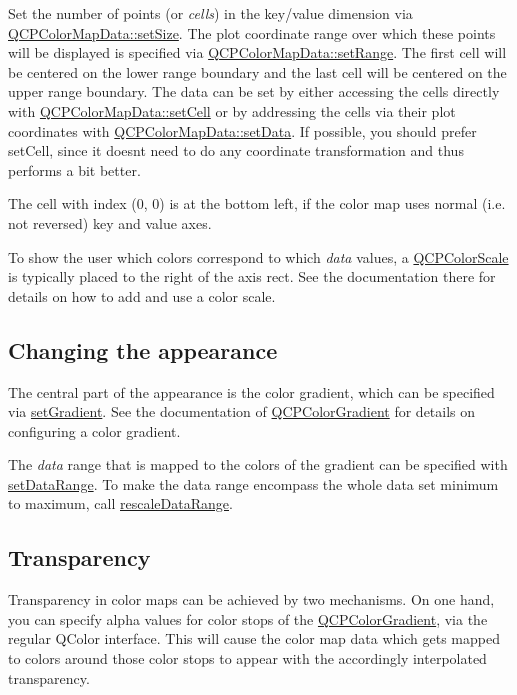 Set the number of points (or {\itshape cells}) in the key/value dimension via \hyperlink{class_q_c_p_color_map_data_a0d9ff35c299d0478b682bfbcdd9c097e}{Q\+C\+P\+Color\+Map\+Data\+::set\+Size}. The plot coordinate range over which these points will be displayed is specified via \hyperlink{class_q_c_p_color_map_data_aad9c1c7c703c1339489fc730517c83d4}{Q\+C\+P\+Color\+Map\+Data\+::set\+Range}. The first cell will be centered on the lower range boundary and the last cell will be centered on the upper range boundary. The data can be set by either accessing the cells directly with \hyperlink{class_q_c_p_color_map_data_a8e75eaf8746596319032a93f3d2d0683}{Q\+C\+P\+Color\+Map\+Data\+::set\+Cell} or by addressing the cells via their plot coordinates with \hyperlink{class_q_c_p_color_map_data_afd2083ccfd6987ec94aa7ef8e91ca39a}{Q\+C\+P\+Color\+Map\+Data\+::set\+Data}. If possible, you should prefer set\+Cell, since it doesn\textquotesingle{}t need to do any coordinate transformation and thus performs a bit better.

The cell with index (0, 0) is at the bottom left, if the color map uses normal (i.\+e. not reversed) key and value axes.

To show the user which colors correspond to which {\itshape data} values, a \hyperlink{class_q_c_p_color_scale}{Q\+C\+P\+Color\+Scale} is typically placed to the right of the axis rect. See the documentation there for details on how to add and use a color scale.\hypertarget{class_q_c_p_color_map_qcpcolormap-appearance}{}\subsection{Changing the appearance}\label{class_q_c_p_color_map_qcpcolormap-appearance}
The central part of the appearance is the color gradient, which can be specified via \hyperlink{class_q_c_p_color_map_a7313c78360471cead3576341a2c50377}{set\+Gradient}. See the documentation of \hyperlink{class_q_c_p_color_gradient}{Q\+C\+P\+Color\+Gradient} for details on configuring a color gradient.

The {\itshape data} range that is mapped to the colors of the gradient can be specified with \hyperlink{class_q_c_p_color_map_a980b42837821159786a85b4b7dcb8774}{set\+Data\+Range}. To make the data range encompass the whole data set minimum to maximum, call \hyperlink{class_q_c_p_color_map_a856608fa3dd1cc290bcd5f29a5575774}{rescale\+Data\+Range}.\hypertarget{class_q_c_p_color_map_qcpcolormap-transparency}{}\subsection{Transparency}\label{class_q_c_p_color_map_qcpcolormap-transparency}
Transparency in color maps can be achieved by two mechanisms. On one hand, you can specify alpha values for color stops of the \hyperlink{class_q_c_p_color_gradient}{Q\+C\+P\+Color\+Gradient}, via the regular Q\+Color interface. This will cause the color map data which gets mapped to colors around those color stops to appear with the accordingly interpolated transparency.

